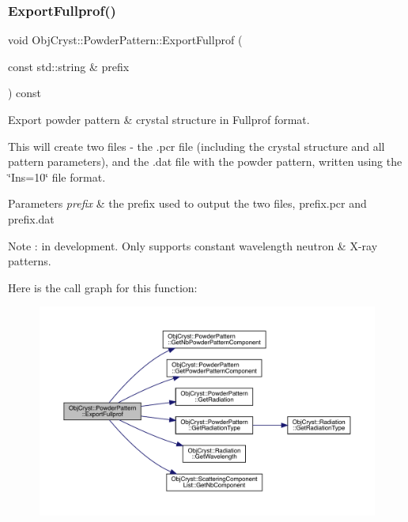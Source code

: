 \subsubsection{\texorpdfstring{ExportFullprof()}{ExportFullprof()}}
{\footnotesize\ttfamily void Obj\+Cryst\+::\+Powder\+Pattern\+::\+Export\+Fullprof (\begin{DoxyParamCaption}\item[{const std\+::string \&}]{prefix }\end{DoxyParamCaption}) const}

Export powder pattern \& crystal structure in Fullprof format.

This will create two files -\/ the .pcr file (including the crystal structure and all pattern parameters), and the .dat file with the powder pattern, written using the \char`\"{}\+Ins=10\char`\"{} file format. 
\begin{DoxyParams}{Parameters}
{\em prefix} & the prefix used to output the two files, \textquotesingle{}prefix\textquotesingle{}.pcr and \textquotesingle{}prefix\textquotesingle{}.dat\\
\hline
\end{DoxyParams}
\begin{DoxyNote}{Note}
\+: in development. Only supports constant wavelength neutron \& X-\/ray patterns. 
\end{DoxyNote}
Here is the call graph for this function\+:
\nopagebreak
\begin{figure}[H]
\begin{center}
\leavevmode
\includegraphics[width=350pt]{class_obj_cryst_1_1_powder_pattern_a5fbc48a5536415de925a4afbb4e6122b_cgraph}
\end{center}
\end{figure}
\mbox{\label{class_obj_cryst_1_1_powder_pattern_add7e991dc93dcd85df4fc41fc2e7fc37}} 
